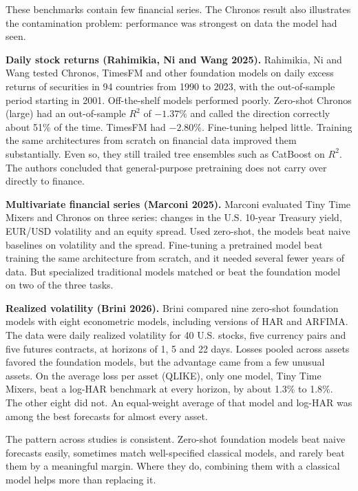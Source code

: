 These benchmarks contain few financial series. The Chronos result also illustrates the contamination problem: performance was strongest on data the model had seen.

\textbf{Daily stock returns (Rahimikia, Ni and Wang 2025).} Rahimikia, Ni and Wang tested Chronos, TimesFM and other foundation models on daily excess returns of securities in 94 countries from 1990 to 2023, with the out-of-sample period starting in 2001. Off-the-shelf models performed poorly. Zero-shot Chronos (large) had an out-of-sample $R^2$ of $-1.37\%$ and called the direction correctly about 51\% of the time. TimesFM had $-2.80\%$. Fine-tuning helped little. Training the same architectures from scratch on financial data improved them substantially. Even so, they still trailed tree ensembles such as CatBoost on $R^2$. The authors concluded that general-purpose pretraining does not carry over directly to finance.

\textbf{Multivariate financial series (Marconi 2025).} Marconi evaluated Tiny Time Mixers and Chronos on three series: changes in the U.S. 10-year Treasury yield, EUR/USD volatility and an equity spread. Used zero-shot, the models beat naive baselines on volatility and the spread. Fine-tuning a pretrained model beat training the same architecture from scratch, and it needed several fewer years of data. But specialized traditional models matched or beat the foundation model on two of the three tasks.

\textbf{Realized volatility (Brini 2026).} Brini compared nine zero-shot foundation models with eight econometric models, including versions of HAR and ARFIMA. The data were daily realized volatility for 40 U.S. stocks, five currency pairs and five futures contracts, at horizons of 1, 5 and 22 days. Losses pooled across assets favored the foundation models, but the advantage came from a few unusual assets. On the average loss per asset (QLIKE), only one model, Tiny Time Mixers, beat a log-HAR benchmark at every horizon, by about 1.3\% to 1.8\%. The other eight did not. An equal-weight average of that model and log-HAR was among the best forecasts for almost every asset.

The pattern across studies is consistent. Zero-shot foundation models beat naive forecasts easily, sometimes match well-specified classical models, and rarely beat them by a meaningful margin. Where they do, combining them with a classical model helps more than replacing it.

